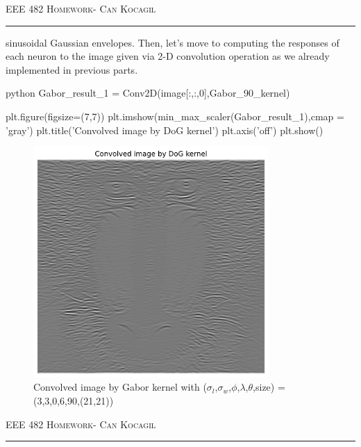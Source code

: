 \documentclass[12pt]{amsart}
\begin{document}
\newpage
{\scshape EEE 482} \hfill {\scshape \large  Homework-\relax} \hfill {\scshape Can Kocagil}
\smallskip
\hrule
\vspace{2mm}

sinusoidal Gaussian envelopes. Then, let's move to computing the responses of each neuron to the image given via 2-D convolution operation as we already implemented in previous parts.


\begin{mintedbox}{python}
Gabor_result_1 = Conv2D(image[:,:,0],Gabor_90_kernel)

plt.figure(figsize=(7,7))
plt.imshow(min_max_scaler(Gabor_result_1),cmap = 'gray')
plt.title('Convolved image by DoG kernel')
plt.axis('off')
plt.show()
\end{mintedbox}


\begin{figure}[ht]
    \centering
    \includegraphics[width = 0.8\textwidth]{images/Gabor_conv_90.png}
    \caption{Convolved image by Gabor kernel with ($\sigma_l$,$\sigma_w$,$\phi$,$\lambda$,$\theta$,size) = (3,3,0,6,90,(21,21))}
\end{figure}

\newpage
{\scshape EEE 482} \hfill {\scshape \large  Homework-\relax} \hfill {\scshape Can Kocagil}
\smallskip
\hrule
\vspace{2mm}
\end{document}
